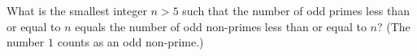 What is the smallest integer $n>5$ such that the number of odd primes less than or equal to $n$ equals the number of odd non-primes less than or equal to $n$? (The number $1$ counts as an odd non-prime.)
